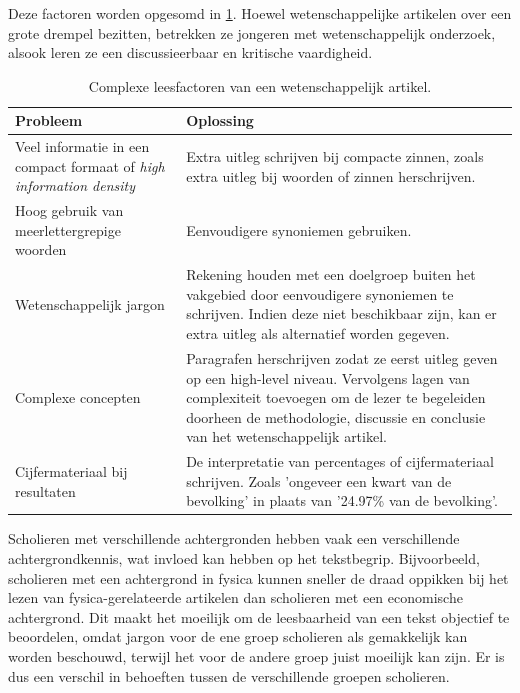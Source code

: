 \medspace

Deze factoren worden opgesomd in \ref{table:scientific-paper-struggles}. Hoewel wetenschappelijke artikelen over een grote drempel bezitten, betrekken ze jongeren met wetenschappelijk onderzoek, alsook leren ze een discussieerbaar en kritische vaardigheid. 

\medspace

\begin{center}
	\begin{table}[H]
	\begin{tabular}{| m{4cm} | m{10cm} |}
		\hline
		\textbf{Probleem} & \textbf{Oplossing} \\
		\hline
		Veel informatie in een compact formaat of \textit{high information density} & Extra uitleg schrijven bij compacte zinnen, zoals extra uitleg bij woorden of zinnen herschrijven. \\
		\hline
		Hoog gebruik van meerlettergrepige woorden & Eenvoudigere synoniemen gebruiken. \\
		\hline
		Wetenschappelijk jargon & Rekening houden met een doelgroep buiten het vakgebied door eenvoudigere synoniemen te schrijven. Indien deze niet beschikbaar zijn, kan er extra uitleg als alternatief worden gegeven. \\
		\hline
		Complexe concepten & Paragrafen herschrijven zodat ze eerst uitleg geven op een high-level niveau. Vervolgens lagen van complexiteit toevoegen om de lezer te begeleiden doorheen de methodologie, discussie en conclusie van het wetenschappelijk artikel. \\ 
		\hline
		Cijfermateriaal bij resultaten & De interpretatie van percentages of cijfermateriaal schrijven. Zoals 'ongeveer een kwart van de bevolking' in plaats van '24.97\% van de bevolking'. \\
		\hline
	\end{tabular}
	\label{table:scientific-paper-struggles}
	\caption{Complexe leesfactoren van een wetenschappelijk artikel.}
	\end{table}
\end{center}

Scholieren met verschillende achtergronden hebben vaak een verschillende achtergrondkennis, wat invloed kan hebben op het tekstbegrip. Bijvoorbeeld, scholieren met een achtergrond in fysica kunnen sneller de draad oppikken bij het lezen van fysica-gerelateerde artikelen dan scholieren met een economische achtergrond. Dit maakt het moeilijk om de leesbaarheid van een tekst objectief te beoordelen, omdat jargon voor de ene groep scholieren als gemakkelijk kan worden beschouwd, terwijl het voor de andere groep juist moeilijk kan zijn. Er is dus een verschil in behoeften tussen de verschillende groepen scholieren.

